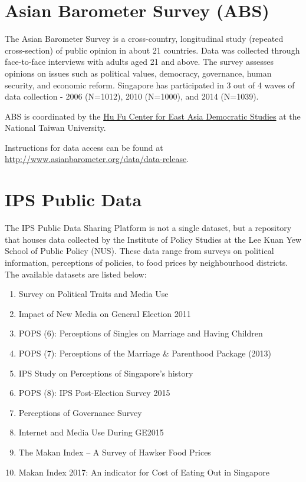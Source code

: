 \documentclass[
  openany]{book}
\providecommand{\tightlist}{%
  \setlength{\itemsep}{0pt}\setlength{\parskip}{0pt}}
\begin{document}
\hypertarget{abs}{%
\section{Asian Barometer Survey (ABS)}\label{abs}}

The Asian Barometer Survey is a cross-country, longitudinal study (repeated cross-section) of public opinion in about 21 countries. Data was collected through face-to-face interviews with adults aged 21 and above. The survey assesses opinions on issues such as political values, democracy, governance, human security, and economic reform. Singapore has participated in 3 out of 4 waves of data collection - 2006 (N=1012), 2010 (N=1000), and 2014 (N=1039).

ABS is coordinated by the \href{http://www.asianbarometer.org/structure}{Hu Fu Center for East Asia Democratic Studies} at the National Taiwan University.

Instructions for data access can be found at \url{http://www.asianbarometer.org/data/data-release}.

\hypertarget{ips}{%
\section{IPS Public Data}\label{ips}}

The IPS Public Data Sharing Platform is not a single dataset, but a repository that houses data collected by the Institute of Policy Studies at the Lee Kuan Yew School of Public Policy (NUS). These data range from surveys on political information, perceptions of policies, to food prices by neighbourhood districts. The available datasets are listed below:

\begin{enumerate}
\def\labelenumi{\arabic{enumi})}
\tightlist
\item
  Survey on Political Traits and Media Use
\item
  Impact of New Media on General Election 2011
\item
  POPS (6): Perceptions of Singles on Marriage and Having Children
\item
  POPS (7): Perceptions of the Marriage \& Parenthood Package (2013)
\item
  IPS Study on Perceptions of Singapore's history
\item
  POPS (8): IPS Post-Election Survey 2015
\item
  Perceptions of Governance Survey
\item
  Internet and Media Use During GE2015
\item
  The Makan Index -- A Survey of Hawker Food Prices
\item
  Makan Index 2017: An indicator for Cost of Eating Out in Singapore
\end{enumerate}
\end{document}
